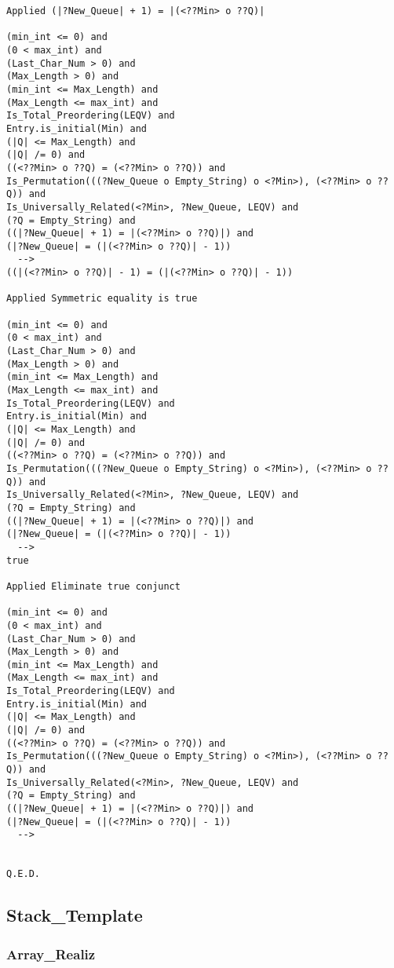 \begin{lstlisting}[language=resolve]
Applied (|?New_Queue| + 1) = |(<??Min> o ??Q)|

(min_int <= 0) and
(0 < max_int) and
(Last_Char_Num > 0) and
(Max_Length > 0) and
(min_int <= Max_Length) and
(Max_Length <= max_int) and
Is_Total_Preordering(LEQV) and
Entry.is_initial(Min) and
(|Q| <= Max_Length) and
(|Q| /= 0) and
((<??Min> o ??Q) = (<??Min> o ??Q)) and
Is_Permutation(((?New_Queue o Empty_String) o <?Min>), (<??Min> o ??Q)) and
Is_Universally_Related(<?Min>, ?New_Queue, LEQV) and
(?Q = Empty_String) and
((|?New_Queue| + 1) = |(<??Min> o ??Q)|) and
(|?New_Queue| = (|(<??Min> o ??Q)| - 1))
  -->
((|(<??Min> o ??Q)| - 1) = (|(<??Min> o ??Q)| - 1))

Applied Symmetric equality is true

(min_int <= 0) and
(0 < max_int) and
(Last_Char_Num > 0) and
(Max_Length > 0) and
(min_int <= Max_Length) and
(Max_Length <= max_int) and
Is_Total_Preordering(LEQV) and
Entry.is_initial(Min) and
(|Q| <= Max_Length) and
(|Q| /= 0) and
((<??Min> o ??Q) = (<??Min> o ??Q)) and
Is_Permutation(((?New_Queue o Empty_String) o <?Min>), (<??Min> o ??Q)) and
Is_Universally_Related(<?Min>, ?New_Queue, LEQV) and
(?Q = Empty_String) and
((|?New_Queue| + 1) = |(<??Min> o ??Q)|) and
(|?New_Queue| = (|(<??Min> o ??Q)| - 1))
  -->
true

Applied Eliminate true conjunct

(min_int <= 0) and
(0 < max_int) and
(Last_Char_Num > 0) and
(Max_Length > 0) and
(min_int <= Max_Length) and
(Max_Length <= max_int) and
Is_Total_Preordering(LEQV) and
Entry.is_initial(Min) and
(|Q| <= Max_Length) and
(|Q| /= 0) and
((<??Min> o ??Q) = (<??Min> o ??Q)) and
Is_Permutation(((?New_Queue o Empty_String) o <?Min>), (<??Min> o ??Q)) and
Is_Universally_Related(<?Min>, ?New_Queue, LEQV) and
(?Q = Empty_String) and
((|?New_Queue| + 1) = |(<??Min> o ??Q)|) and
(|?New_Queue| = (|(<??Min> o ??Q)| - 1))
  -->


Q.E.D.
\end{lstlisting}

	\subsection{Stack\_Template}	%

		\subsubsection{Array\_Realiz}	%

